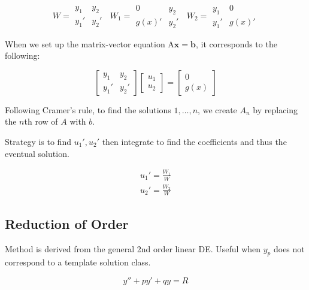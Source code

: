 \begin{equation}
W=
\begin{array}{|cc|}
    y_1&y_2\\
    y_1'&y_2'
\end{array}\;\;
W_1=\begin{array}{|cc|}
    0&y_2\\
    g(x)'&y_2'
\end{array}\;\;
W_2=\begin{array}{|cc|}
    y_1&0\\
    y_1'&g(x)'
\end{array}
\end{equation}

When we set up the matrix-vector equation $\mathrm{A}\mathbf{x}=\mathbf{b}$, it corresponds to the following:

\begin{equation}
    \begin{bmatrix}
        y_1 & y_2\\
        y_1' & y_2'
    \end{bmatrix}
    \begin{bmatrix}
        u_1\\u_2
    \end{bmatrix}
    =\begin{bmatrix}
        0\\g(x)
    \end{bmatrix}
\end{equation}

Following Cramer's rule, to find the solutions $1,\ldots,n$, we create $A_n$ by replacing the $n$th row of $A$ with $b$.

Strategy is to find $u_1', u_2'$ then integrate to find the coefficients and thus the eventual solution.

\begin{eqnarray}
    u_1'=\frac{W_1}{W}\\
    u_2'=\frac{W_2}{W}
\end{eqnarray}

\subsection{Reduction of Order}

Method is derived from the general 2nd order linear DE. Useful when $y_p$ does not correspond to a template solution class.

\begin{equation}
    y''+py'+qy=R\label{original}
\end{equation}

